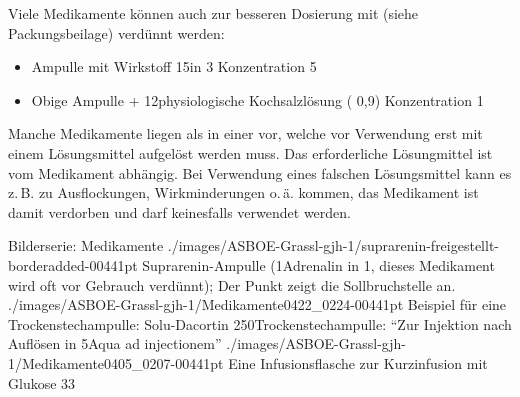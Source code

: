 {Viele Medikamente können auch zur besseren Dosierung
mit  (siehe
Packungsbeilage) verdünnt werden:
\begin{itemize}
  \item Ampulle mit Wirkstoff 15\Mg* in 3\Ml* 
  {\dotfill} Konzentration 5\,\nicefrac{\Mg}{\Ml}
  \item Obige Ampulle 
  + 12\Ml* physiologische Kochsalzlösung 
  ( 0,9\PC) 
  {\dotfill} Konzentration 1\,\nicefrac{\Mg}{\Ml}
\end{itemize}

Manche Medikamente liegen als  in einer
 vor, welche vor Verwendung erst mit
einem  Lösungsmittel aufgelöst werden muss.
Das erforderliche Lösungmittel ist vom Medikament abhängig.
Bei Verwendung eines falschen Lösungsmittel kann es z.\,B.
zu Ausflockungen, Wirkminderungen o.\,ä. kommen, das
Medikament ist damit verdorben und darf keinesfalls
verwendet werden.

}
{}
{}
{}
{}


\begin{PictureSeriesWide}{}{Bilderserie: Medikamente }
{./images/ASBOE-Grassl-gjh-1/suprarenin-freigestellt-borderadded-00441pt}
{Suprarenin{\texttrademark}-Ampulle
(1\Mg* Adrenalin in 1\Ml*, dieses Medikament wird oft vor Gebrauch verdünnt);
Der Punkt zeigt die Sollbruchstelle an.}
{./images/ASBOE-Grassl-gjh-1/Medikamente0422_0224-00441pt}
{Beispiel für eine Trockenstechampulle: 
Solu-Dacortin{\texttrademark} 250\Mg* Trockenstechampulle: 
\enquote{Zur Injektion nach Auflösen in 5\Mg* Aqua ad injectionem}}
{./images/ASBOE-Grassl-gjh-1/Medikamente0405_0207-00441pt}
{Eine Infusionsflasche zur Kurzinfusion mit Glukose 33\PC}
{}
{}
\end{PictureSeriesWide}

